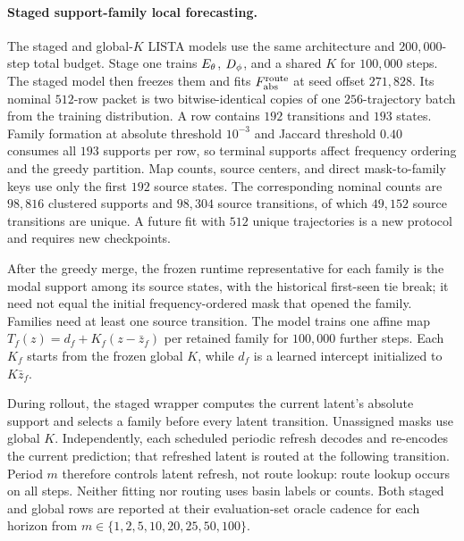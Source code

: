 \paragraph{Staged support-family local forecasting.}
The staged and global-\(K\) LISTA models use the same architecture and \(200{,}000\)-step total budget. Stage one trains \(E_\theta\), \(D_\phi\), and a shared \(K\) for \(100{,}000\) steps. The staged model then freezes them and fits \(F_{\rm abs}^{\rm route}\) at seed offset \(271{,}828\). Its nominal \(512\)-row packet is two bitwise-identical copies of one \(256\)-trajectory batch from the training distribution. A row contains \(192\) transitions and \(193\) states. Family formation at absolute threshold \(10^{-3}\) and Jaccard threshold \(0.40\) consumes all \(193\) supports per row, so terminal supports affect frequency ordering and the greedy partition. Map counts, source centers, and direct mask-to-family keys use only the first \(192\) source states. The corresponding nominal counts are \(98{,}816\) clustered supports and \(98{,}304\) source transitions, of which \(49{,}152\) source transitions are unique. A future fit with \(512\) unique trajectories is a new protocol and requires new checkpoints.

After the greedy merge, the frozen runtime representative for each family is the modal support among its source states, with the historical first-seen tie break; it need not equal the initial frequency-ordered mask that opened the family. Families need at least one source transition. The model trains one affine map \(T_f(z)=d_f+K_f(z-\bar z_f)\) per retained family for \(100{,}000\) further steps. Each \(K_f\) starts from the frozen global \(K\), while \(d_f\) is a learned intercept initialized to \(K\bar z_f\).

During rollout, the staged wrapper computes the current latent's absolute support and selects a family before every latent transition. Unassigned masks use global \(K\). Independently, each scheduled periodic refresh decodes and re-encodes the current prediction; that refreshed latent is routed at the following transition. Period \(m\) therefore controls latent refresh, not route lookup: route lookup occurs on all steps. Neither fitting nor routing uses basin labels or counts. Both staged and global rows are reported at their evaluation-set oracle cadence for each horizon from \(m\in\{1,2,5,10,20,25,50,100\}\).

